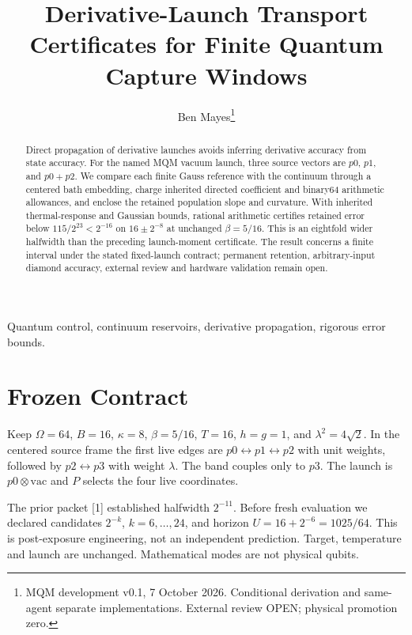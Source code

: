 \documentclass[a4paper,journal]{IEEEtran}
\begin{document}
\title{Derivative-Launch Transport Certificates for Finite Quantum Capture Windows}
\author{Ben Mayes\thanks{MQM development v0.1, 7 October 2026. Conditional derivation and same-agent separate implementations. External review OPEN; physical promotion zero.}}
\maketitle
\begin{abstract}
Direct propagation of derivative launches avoids inferring derivative accuracy from state accuracy. For the named MQM vacuum launch, three source vectors are $p0$, $p1$, and $p0+p2$. We compare each finite Gauss reference with the continuum through a centered bath embedding, charge inherited directed coefficient and binary64 arithmetic allowances, and enclose the retained population slope and curvature. With inherited thermal-response and Gaussian bounds, rational arithmetic certifies retained error below $115/2^{23}<2^{-16}$ on $16\pm2^{-8}$ at unchanged $\beta=5/16$. This is an eightfold wider halfwidth than the preceding launch-moment certificate. The result concerns a finite interval under the stated fixed-launch contract; permanent retention, arbitrary-input diamond accuracy, external review and hardware validation remain open.
\end{abstract}
\begin{IEEEkeywords}Quantum control, continuum reservoirs, derivative propagation, rigorous error bounds.\end{IEEEkeywords}
\section{Frozen Contract}
Keep $\Omega=64$, $B=16$, $\kappa=8$, $\beta=5/16$, $T=16$, $h=g=1$, and $\lambda^2=4\sqrt2$. In the centered source frame the first live edges are $p0\leftrightarrow p1\leftrightarrow p2$ with unit weights, followed by $p2\leftrightarrow p3$ with weight $\lambda$. The band couples only to $p3$. The launch is $p0\otimes\mathrm{vac}$ and $P$ selects the four live coordinates.

The prior packet [1] established halfwidth $2^{-11}$. Before fresh evaluation we declared candidates $2^{-k}$, $k=6,\ldots,24$, and horizon $U=16+2^{-6}=1025/64$. This is post-exposure engineering, not an independent prediction. Target, temperature and launch are unchanged. Mathematical modes are not physical qubits.
\end{document}
